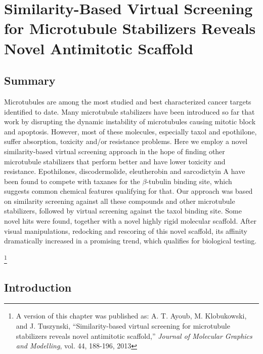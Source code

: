 \documentclass[11pt]{report}
\begin{document}
\chapter{Similarity-Based Virtual Screening for Microtubule Stabilizers Reveals Novel Antimitotic Scaffold}   
\label{TVS}

\section{Summary}

Microtubules are among the most studied and best characterized cancer targets identified to date. Many microtubule stabilizers have been introduced so far that work by disrupting the dynamic instability of microtubules causing mitotic block and apoptosis. However, most of these molecules, especially taxol and epothilone, suffer absorption, toxicity and/or resistance problems. Here we employ a novel similarity-based virtual screening approach in the hope of finding other microtubule stabilizers that perform better and have lower toxicity and resistance. Epothilones, discodermolide, eleutherobin and sarcodictyin A have been found to compete with taxanes for the $\beta$-tubulin binding site, which suggests common chemical features qualifying for that. Our approach was based on similarity screening against all these compounds and other microtubule stabilizers, followed by virtual screening against the taxol binding site. Some novel hits were found, together with a novel highly rigid molecular scaffold. After visual manipulations, redocking and rescoring of this novel scaffold, its affinity dramatically increased in a promising trend, which qualifies for biological testing.

\let\thefootnote\relax\footnote{A version of this chapter was published as: 
A. T. Ayoub, M. Klobukowski, and J. Tuszynski, ``Similarity-based virtual screening for microtubule stabilizers reveals novel antimitotic scaffold,'' \emph{Journal of Molecular Graphics
and Modelling}, vol. 44, 188-196, 2013} 

\section{Introduction}
\label{s:VS-Intro}
\end{document}
